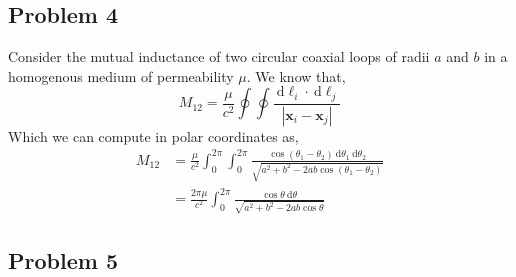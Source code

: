 \documentclass[12pt]{extarticle}
\renewcommand{\d}[1]{\: \mathrm{d}#1}
\renewcommand{\bf}[1]{\mathbf{#1}}
\theoremstyle{definition}
\begin{document}
\subsection{Problem 4}

Consider the mutual inductance of two circular coaxial loops of radii $a$ and $b$ in a homogenous medium of permeability $\mu$. We know that, 
\[ M_{12} = \frac{\mu}{c^2} \oint \oint \frac{\d{\ell_i} \cdot \d{\ell_j}}{|\bf{x}_i - \bf{x}_j|} \]
Which we can compute in polar coordinates as,
\begin{align*}
M_{12} & = \frac{\mu}{c^2} \int_{0}^{2 \pi} \int_0^{2 \pi} \frac{\cos{(\theta_1 - \theta_2)} \d{\theta_1} \d{\theta_2}}{\sqrt{a^2 + b^2 - 2 a b \cos{(\theta_1 - \theta_2)}}}
\\
& = \frac{2 \pi \mu}{c^2} \int_0^{2 \pi} \frac{\cos{\theta} \d{\theta}}{\sqrt{a^2 + b^2 - 2 ab \cos{\theta}}}
\end{align*} 

\subsection{Problem 5}
\end{document}

